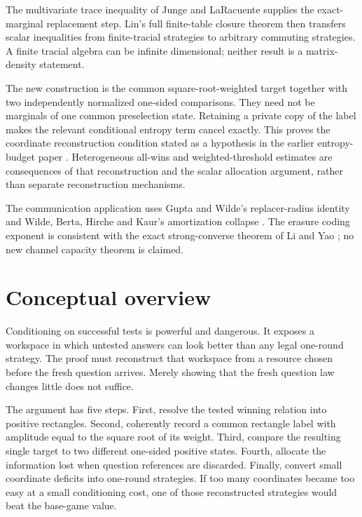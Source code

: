 \documentclass[11pt,reqno]{amsart}
\numberwithin{equation}{section}
\begin{document}
The multivariate trace inequality of Junge and LaRacuente \cite[Theorem I.2 and Lemma VI.2]{JL} supplies the exact-marginal replacement step. Lin's full finite-table closure theorem \cite[Definition 3.1 and Theorem 3.2]{LinTr} then transfers scalar inequalities from finite-tracial strategies to arbitrary commuting strategies. A finite tracial algebra can be infinite dimensional; neither result is a matrix-density statement.

The new construction is the common square-root-weighted target together with two independently normalized one-sided comparisons. They need not be marginals of one common preselection state. Retaining a private copy of the label makes the relevant conditional entropy term cancel exactly. This proves the coordinate reconstruction condition stated as a hypothesis in the earlier entropy-budget paper \cite{Sandhu}. Heterogeneous all-wins and weighted-threshold estimates are consequences of that reconstruction and the scalar allocation argument, rather than separate reconstruction mechanisms.

The communication application uses Gupta and Wilde's replacer-radius identity \cite[Lemma 5]{GW} and Wilde, Berta, Hirche and Kaur's amortization collapse \cite[Proposition 41]{WBHK}. The erasure coding exponent is consistent with the exact strong-converse theorem of Li and Yao \cite[Theorem 6]{LY}; no new channel capacity theorem is claimed.

\section{Conceptual overview}\label{conceptual-overview}

Conditioning on successful tests is powerful and dangerous. It exposes a workspace in which untested answers can look better than any legal one-round strategy. The proof must reconstruct that workspace from a resource chosen before the fresh question arrives. Merely showing that the fresh question law changes little does not suffice.

The argument has five steps. First, resolve the tested winning relation into positive rectangles. Second, coherently record a common rectangle label with amplitude equal to the square root of its weight. Third, compare the resulting single target to two different one-sided positive states. Fourth, allocate the information lost when question references are discarded. Finally, convert small coordinate deficits into one-round strategies. If too many coordinates became too easy at a small conditioning cost, one of those reconstructed strategies would beat the base-game value.
\end{document}
